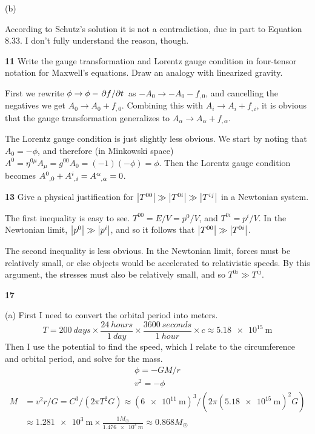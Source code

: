 \documentclass[gr-notes.tex]{subfiles}
\begin{document}
(b)

According to Schutz's solution it is not a contradiction, due in part to Equation 8.33. I don't fully understand the reason, though.


\textbf{11}
Write the gauge transformation and Lorentz gauge condition in four-tensor notation for Maxwell's equations. Draw an analogy with linearized gravity.

First we rewrite $\phi \to \phi - \pdv*{f}{t}$ as $-A_0 \to -A_0 - f_{,0}$, and cancelling the negatives we get $A_0 \to A_0 + f_{,0}$. Combining this with $A_i \to A_i + f_{,i}$, it is obvious that the gauge transformation generalizes to $A_\alpha \to A_\alpha + f_{,\alpha}$.

The Lorentz gauge condition is just slightly less obvious. We start by noting that $A_0 = -\phi$, and therefore (in Minkowski space) $A^0 = \eta^{0\mu} A_\mu = g^{00} A_0 = (-1) (-\phi) = \phi$. Then the Lorentz gauge condition  becomes $\tensor{A}{^0_{,0}} + \tensor{A}{^i_{,i}} = \tensor{A}{^\alpha_{,\alpha}} = 0$.



\textbf{13}
Give a physical justification for $\abs{T^{00}} \gg \abs{T^{0i}} \gg \abs{T^{ij}}$ in a Newtonian system.

The first inequality is easy to see. $T^{00} = E / V = p^0 / V$, and $T^{0i} = p^i / V$. In the Newtonian limit, $\abs{p^0} \gg \abs{p^i}$, and so it follows that $\abs{T^{00}} \gg \abs{T^{0i}}$.

The second inequality is less obvious. In the Newtonian limit, forces must be relatively small, or else objects would be accelerated to relativistic speeds. By this argument, the stresses must also be relatively small, and so $T^{0i} \gg T^{ij}$.

\textbf{17}

(a) First I need to convert the orbital period into meters.
%
\begin{displaymath}
  T =
  \SI{200}{days} \times
  \frac{\SI{24}{hours}}{\SI{1}{day}} \times
  \frac{\SI{3600}{seconds}}{\SI{1}{hour}} \times
  c \approx
  \SI{5.18e15}{\meter}
\end{displaymath}
%
Then I use the potential to find the speed, which I relate to the circumference and orbital period, and solve for the mass.
%
\begin{gather*}
  \phi = -G M / r
  \\
  v^2 = -\phi
\end{gather*}
\begin{align*}
  M &= v^2 r / G = C^3 / (2 \pi T^2 G) \approx
  (\SI{6e11}{\meter})^3 / (2 \pi (\SI{5.18e15}{\meter})^2 G)
  \\ &\approx
  \SI{1.281e3}{\meter} \times \frac{1 M_\Sun}{\SI{1.476e3}{m}} \approx
  0.868 M_\Sun
\end{align*}
\end{document}
